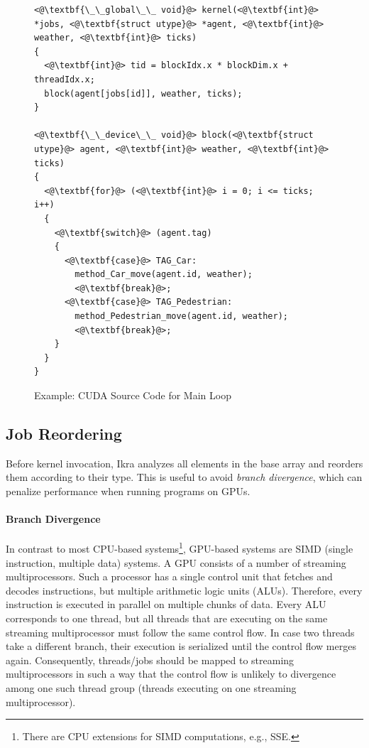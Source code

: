 \documentclass[preprint]{sigplanconf}
\begin{document}
\lstset{language=C++}
\begin{figure}[!htp]
\begin{lstlisting}
<@\textbf{\_\_global\_\_ void}@> kernel(<@\textbf{int}@> *jobs, <@\textbf{struct utype}@> *agent, <@\textbf{int}@> weather, <@\textbf{int}@> ticks)
{
  <@\textbf{int}@> tid = blockIdx.x * blockDim.x + threadIdx.x;
  block(agent[jobs[id]], weather, ticks);
}

<@\textbf{\_\_device\_\_ void}@> block(<@\textbf{struct utype}@> agent, <@\textbf{int}@> weather, <@\textbf{int}@> ticks)
{
  <@\textbf{for}@> (<@\textbf{int}@> i = 0; i <= ticks; i++)
  {
    <@\textbf{switch}@> (agent.tag)
    {
      <@\textbf{case}@> TAG_Car:
        method_Car_move(agent.id, weather);
        <@\textbf{break}@>;
      <@\textbf{case}@> TAG_Pedestrian:
        method_Pedestrian_move(agent.id, weather);
        <@\textbf{break}@>;
    }
  }
}
\end{lstlisting}
\caption{Example: CUDA Source Code for Main Loop}
\label{fig:listing_cuda_main}
\end{figure}

\subsection{Job Reordering}
Before kernel invocation, Ikra analyzes all elements in the base array and reorders them according to their type. This is useful to avoid \emph{branch divergence}, which can penalize performance when running programs on GPUs.

\paragraph{Branch Divergence}
In contrast to most CPU-based systems\footnote{There are CPU extensions for SIMD computations, e.g., SSE.}, GPU-based systems are SIMD (single instruction, multiple data) systems. A GPU consists of a number of streaming multiprocessors. Such a processor has a single control unit that fetches and decodes instructions, but multiple arithmetic logic units (ALUs). Therefore, every instruction is executed in parallel on multiple chunks of data. Every ALU corresponds to one thread, but all threads that are executing on the same streaming multiprocessor must follow the same control flow. In case two threads take a different branch, their execution is serialized until the control flow merges again. Consequently, threads/jobs should be mapped to streaming multiprocessors in such a way that the control flow is unlikely to divergence among one such thread group (threads executing on one streaming multiprocessor).
\end{document}

